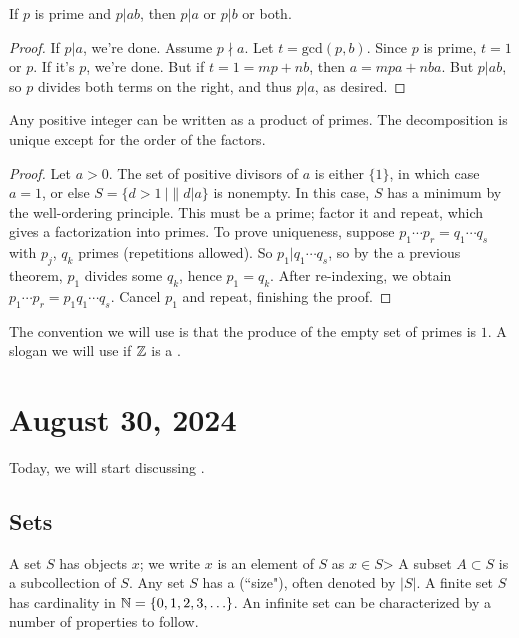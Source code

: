 \documentclass[12pt]{scrartcl}
\begin{document}
\begin{theorem}
    If $p$ is prime and $p|ab$, then $p|a$ or $p|b$ or both.
\end{theorem}

\begin{proof}
    If $p|a$, we're done. Assume $p \nmid a$. Let $t = \text{gcd}(p, b)$. Since $p$ is prime, $t = 1$ or $p$. If it's $p$, we're done. But if $t = 1 = mp + nb$, then $a = mpa + nba$. But $p|ab$, so $p$ divides both terms on the right, and thus $p|a$, as desired.
\end{proof}

\begin{theorem}
    Any positive integer can be written as a product of primes. The decomposition is unique except for the order of the factors.
\end{theorem}

\begin{proof}
    Let $a > 0$. The set of positive divisors of $a$ is either $\{1\}$, in which case $a = 1$, or else $S = \{d > 1 \ | \| d|a\}$ is nonempty. In this case, $S$ has a minimum by the well-ordering principle. This must be a prime; factor it and repeat, which gives a factorization into primes. To prove uniqueness, suppose $p_1 \cdots p_r = q_1 \cdots q_s$ with $p_j$, $q_k$ primes (repetitions allowed). So $p_1|q_1 \cdots q_s$, so by the a previous theorem, $p_1$ divides some $q_k$, hence $p_1 = q_k$. After re-indexing, we obtain $p_1 \cdots p_r = p_1q_1 \cdots q_s$. Cancel $p_1$ and repeat, finishing the proof.
\end{proof}

\begin{remark}
    The convention we will use is that the produce of the empty set of primes is $1$. A slogan we will use if $\mathbb Z$ is a .
\end{remark}

\section{August 30, 2024}
Today, we will start discussing .

\subsection{Sets}
A set $S$ has objects $x$; we write $x$ is an element of $S$ as $x \in S$> A subset $A \subset S$ is a subcollection of $S$. Any set $S$ has a  (``size"), often denoted by $|S|$. A finite set $S$ has cardinality in $\mathbb N = \{0, 1, 2, 3, \ldots\}$. An infinite set can be characterized by a number of properties to follow.
\end{document}
